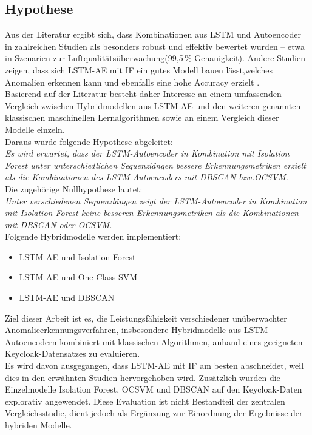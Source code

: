 \documentclass[a4paper,12pt]{article}
\begin{document}
	\subsection{Hypothese}
	Aus der Literatur ergibt sich, dass Kombinationen aus LSTM und Autoencoder in zahlreichen Studien als besonders robust und effektiv bewertet wurden – etwa in Szenarien zur Luftqualitätsüberwachung(99{,}5\,\% Genauigkeit)\cite{wei2023lstm}.
	Andere Studien zeigen, dass sich LSTM-AE mit IF ein gutes Modell bauen lässt,welches Anomalien erkennen kann und ebenfalls eine hohe Accuracy erzielt \cite{tran2020lstm_if}.
	\\[0.5em]
	Basierend auf der Literatur besteht daher Interesse an einem umfassenden Vergleich zwischen Hybridmodellen aus LSTM-AE und den weiteren genannten klassischen maschinellen Lernalgorithmen sowie an einem Vergleich dieser Modelle einzeln.
	\\[0.5em]
	Daraus wurde folgende Hypothese abgeleitet:
	\\[0.5em]
	\textit{Es wird erwartet, dass der LSTM-Autoencoder in Kombination mit Isolation Forest unter unterschiedlichen Sequenzlängen bessere Erkennungsmetriken erzielt als die Kombinationen des LSTM-Autoencoders mit DBSCAN bzw.OCSVM.}
	\\[0.5em]
	Die zugehörige Nullhypothese lautet:
	\\[0.5em]
	\textit{Unter verschiedenen Sequenzlängen zeigt der LSTM-Autoencoder in Kombination mit Isolation Forest keine besseren Erkennungsmetriken als die Kombinationen mit DBSCAN oder OCSVM.}
	\\[0.5em]
	Folgende Hybridmodelle werden implementiert:
	\begin{itemize}
		\item LSTM-AE und Isolation Forest
		\item LSTM-AE und One-Class SVM
		\item LSTM-AE und DBSCAN
	\end{itemize}
	Ziel dieser Arbeit ist es, die Leistungsfähigkeit verschiedener unüberwachter Anomalieerkennungsverfahren, insbesondere Hybridmodelle aus LSTM-Autoencodern kombiniert mit klassischen Algorithmen, anhand eines geeigneten Keycloak-Datensatzes zu evaluieren. 
	\\[0.5em]
	Es wird davon ausgegangen, dass LSTM-AE mit IF am besten abschneidet, weil dies in den erwähnten Studien hervorgehoben wird.
	Zusätzlich wurden die Einzelmodelle Isolation Forest, OCSVM und DBSCAN auf den Keycloak-Daten explorativ angewendet. Diese Evaluation ist nicht Bestandteil der zentralen Vergleichsstudie, dient jedoch als Ergänzung zur Einordnung der Ergebnisse der hybriden Modelle.
\end{document}
